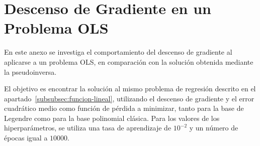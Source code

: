 
\chapter{Descenso de Gradiente en un Problema OLS}\label{ap:apendiceC}

En este anexo se investiga el comportamiento del descenso de gradiente al aplicarse a un problema OLS, en comparación con la solución obtenida mediante la pseudoinversa.\newline

El objetivo es encontrar la solución al mismo problema de regresión descrito en el apartado~\ref{subsubsec:funcion-lineal}, utilizando el descenso de gradiente y el error cuadrático medio como función de pérdida a minimizar, tanto para la base de Legendre como para la base polinomial clásica. Para los valores de los hiperparámetros, se utiliza una tasa de aprendizaje de $10^{-2}$ y un número de épocas igual a $10000$.\newline

